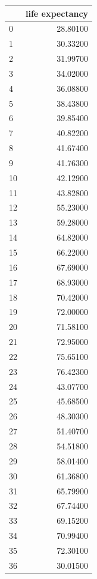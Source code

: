 \documentclass[
  letterpaper,
  DIV=11,
  numbers=noendperiod]{scrreprt}
\begin{document}
\begin{tcolorbox}
\begin{tabular}{lr}
\toprule
{} &  life expectancy \\
\midrule
0    &         28.80100 \\
1    &         30.33200 \\
2    &         31.99700 \\
3    &         34.02000 \\
4    &         36.08800 \\
5    &         38.43800 \\
6    &         39.85400 \\
7    &         40.82200 \\
8    &         41.67400 \\
9    &         41.76300 \\
10   &         42.12900 \\
11   &         43.82800 \\
12   &         55.23000 \\
13   &         59.28000 \\
14   &         64.82000 \\
15   &         66.22000 \\
16   &         67.69000 \\
17   &         68.93000 \\
18   &         70.42000 \\
19   &         72.00000 \\
20   &         71.58100 \\
21   &         72.95000 \\
22   &         75.65100 \\
23   &         76.42300 \\
24   &         43.07700 \\
25   &         45.68500 \\
26   &         48.30300 \\
27   &         51.40700 \\
28   &         54.51800 \\
29   &         58.01400 \\
30   &         61.36800 \\
31   &         65.79900 \\
32   &         67.74400 \\
33   &         69.15200 \\
34   &         70.99400 \\
35   &         72.30100 \\
36   &         30.01500 \\

\end{tabular}
\end{tcolorbox}
\end{document}
